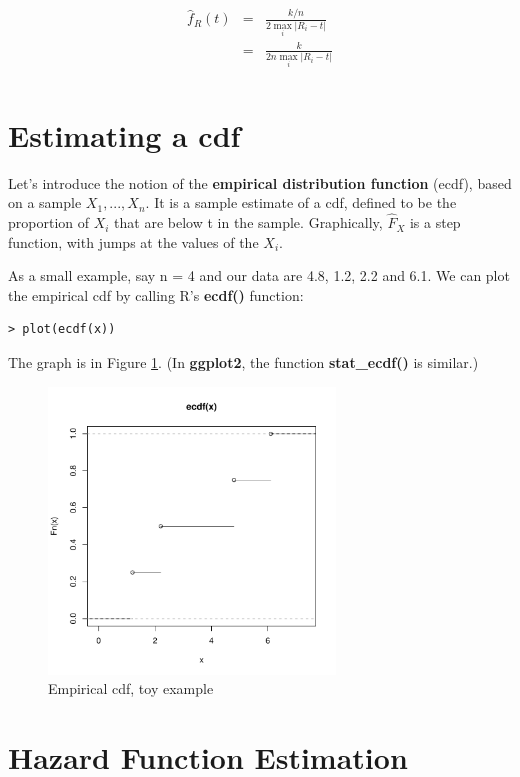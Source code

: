 \begin{eqnarray}
\widehat{f}_R(t) &=& 
   \frac{k/n}{2\max_i |R_i - t|} \\ 
&=& 
   \frac{k}{2n \max_i |R_i - t|} \\ 
\end{eqnarray}


\section{Estimating a cdf}
\label{ecdfsec}

Let's introduce the notion of the {\bf empirical distribution function}
(ecdf), based on a sample $X_1,...,X_n$.  It is a sample estimate of a
cdf, defined to be the proportion of $X_i$ that are below t in the
sample.  Graphically, $\widehat{F}_X$ is a step function, with jumps at
the values of the $X_i$.

As a small example, say n = 4 and our data are 4.8, 1.2, 2.2 and
6.1.  We can plot the empirical cdf by calling R's {\bf ecdf()}
function:
 
\begin{Verbatim}[fontsize=\relsize{-2}]
> plot(ecdf(x))
\end{Verbatim}

The graph is in Figure \ref{ecdffig}.  (In {\bf ggplot2}, the function
{\bf stat\_ecdf()} is similar.)

\begin{figure}[tb] 
\centerline{
\includegraphics[width=3.0in]{EmpCDF.pdf} 
}
\caption{Empirical cdf, toy example}
\label{ecdffig}  
\end{figure}

\section{Hazard Function Estimation}


